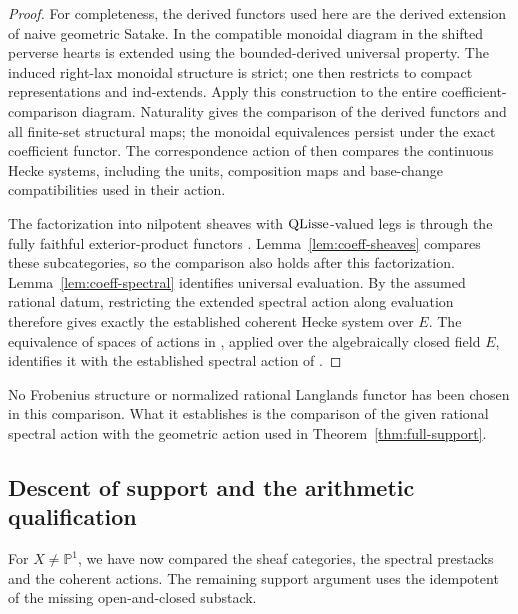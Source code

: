 \begin{proof}
For completeness, the derived functors used here are the derived
extension of naive geometric Satake. In
\cite[\S\S B.3.5--B.3.8]{GKRV} the compatible monoidal diagram in
the shifted perverse hearts is extended using the bounded-derived
universal property. The induced right-lax monoidal structure is strict;
one then restricts to compact representations and ind-extends.
Apply this construction
to the entire coefficient-comparison diagram. Naturality gives the
comparison of the derived functors and all finite-set structural
maps; the monoidal equivalences persist under the exact coefficient
functor. The correspondence action of
\cite[\S\S B.2.5--B.2.10]{GKRV} then compares the continuous Hecke
systems, including the units, composition maps and base-change
compatibilities used in their action.

The factorization into nilpotent sheaves with $\operatorname{QLisse}$-valued legs
is through the fully faithful exterior-product functors
\cite[\S14.2.5]{AGKRRV}. Lemma~\ref{lem:coeff-sheaves} compares
these subcategories, so the comparison also holds after this
factorization. Lemma~\ref{lem:coeff-spectral} identifies universal
evaluation. By the assumed rational datum, restricting the extended
spectral action along evaluation therefore gives exactly the
established coherent Hecke system over $E$. The equivalence of spaces
of actions in \cite[Theorem~8.1.4]{AGKRRV}, applied over the
algebraically closed field $E$, identifies it with the established
spectral action of \cite[Theorem~14.3.2]{AGKRRV}.
\end{proof}

No Frobenius structure or normalized rational Langlands functor has
been chosen in this comparison. What it establishes is the comparison
of the given rational spectral action with the geometric action used
in Theorem~\ref{thm:full-support}.

\subsection{Descent of support and the arithmetic qualification}

For $X\ne\mathbb P^1$, we have now compared the sheaf categories,
the spectral prestacks and the coherent actions. The remaining support argument uses the
idempotent of the missing open-and-closed substack.

